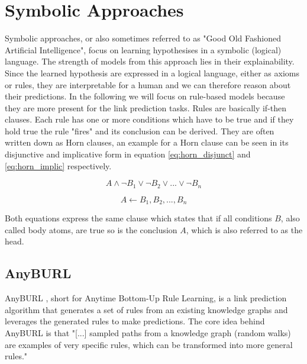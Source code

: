 \section{Symbolic Approaches}
\label{cha:symbolic_methods}
Symbolic approaches, or also sometimes referred to as "Good Old Fashioned Artificial Intelligence", focus on learning hypothesises in a symbolic (logical) language. \cite{hogan_knowledge_2020} The strength of models from this approach lies in their explainability. Since the learned hypothesis are expressed in a logical language, either as axioms or rules, they are interpretable for a human and we can therefore reason about their predictions. In the following we will focus on rule-based models because they are more present for the link prediction tasks.  \cite{hatzilygeroudis_neuro-symbolic_2005} 
Rules are basically if-then clauses. Each rule has one or more conditions which have to be true and if they hold true the rule "fires" and its conclusion can be derived. They are often written down as Horn clauses, an example for a Horn clause can be seen in its disjunctive and implicative form in equation \ref{eq:horn_disjunct} and \ref{eq:horn_implic} respectively. \cite{chandra_horn_1985}

\begin{equation}
\label{eq:horn_disjunct}
A \wedge \neg B_1 \vee \neg B_2 \vee ... \vee \neg B_n \end{equation}

\begin{equation}
\label{eq:horn_implic}
A \leftarrow B_1, B_2, ..., B_n
\end{equation}

Both equations express the same clause which states that if all conditions $B$, also called body atoms, are true so is the conclusion $A$, which is also referred to as the head.

\subsection{AnyBURL}
\label{cha:anyburl}
AnyBURL \cite{meilicke_anytime_2019}, short for Anytime Bottom-Up Rule Learning, is a link prediction algorithm that generates a set of rules from an existing knowledge graphs and leverages the generated rules to make predictions. The core idea behind AnyBURL  is that "[...] sampled paths from a knowledge graph (random walks) are examples of very specific rules, which can be transformed into more general rules." \cite{ott_safran_2021} 







